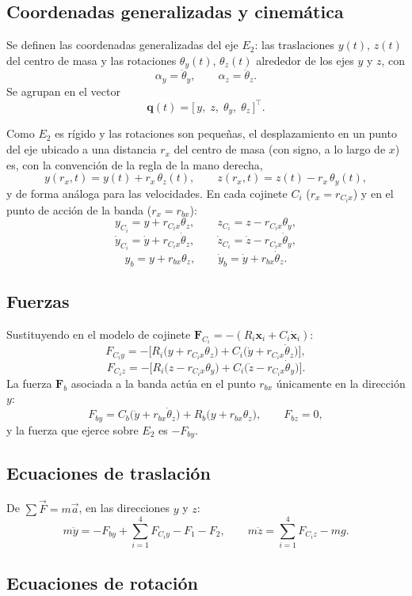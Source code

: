 \subsection{Coordenadas generalizadas y cinemática}

Se definen las coordenadas generalizadas del eje $E_2$: las traslaciones $y(t)$, $z(t)$ del centro de masa y las rotaciones 
$\theta_y(t)$, $\theta_z(t)$ alrededor de los ejes $y$ y $z$, con
\[
\alpha_y=\ddot\theta_y,\qquad \alpha_z=\ddot\theta_z .
\]
Se agrupan en el vector
\[
\mathbf q(t)=\big[\,y,\;z,\;\theta_y,\;\theta_z\,\big]^\top .
\]

Como $E_2$ es rígido y las rotaciones son pequeñas, el desplazamiento en un punto del eje ubicado a una distancia $r_x$ 
del centro de masa (con signo, a lo largo de $x$) es, con la convención de la regla de la mano derecha,
\[
y(r_x,t)=y(t)+r_x\,\theta_z(t),\qquad
z(r_x,t)=z(t)-r_x\,\theta_y(t),
\]
y de forma análoga para las velocidades. En cada cojinete $C_i$ ($r_x=r_{C_ix}$) y en el punto de acción de la banda 
($r_x=r_{bx}$):
\[
y_{C_i}=y+r_{C_ix}\theta_z,\qquad z_{C_i}=z-r_{C_ix}\theta_y,
\]
\[
\dot y_{C_i}=\dot y+r_{C_ix}\dot\theta_z,\qquad \dot z_{C_i}=\dot z-r_{C_ix}\dot\theta_y,
\]
\[
y_b=y+r_{bx}\theta_z,\qquad \dot y_b=\dot y+r_{bx}\dot\theta_z .
\]

\subsection{Fuerzas}

Sustituyendo en el modelo de cojinete $\mathbf F_{C_i}=-(R_i\mathbf x_i+C_i\dot{\mathbf x}_i)$:
\[
F_{C_iy}=-\big[R_i\big(y+r_{C_ix}\theta_z\big)+C_i\big(\dot y+r_{C_ix}\dot\theta_z\big)\big],
\]
\[
F_{C_iz}=-\big[R_i\big(z-r_{C_ix}\theta_y\big)+C_i\big(\dot z-r_{C_ix}\dot\theta_y\big)\big].
\]
La fuerza $\mathbf F_b$ asociada a la banda actúa en el punto $r_{bx}$ únicamente en la dirección $y$:
\[
F_{by}=C_b\big(\dot y+r_{bx}\dot\theta_z\big)+R_b\big(y+r_{bx}\theta_z\big),
\qquad F_{bz}=0 ,
\]
y la fuerza que ejerce sobre $E_2$ es $-F_{by}$.

\subsection{Ecuaciones de traslación}

De $\sum\vec F=m\vec a$, en las direcciones $y$ y $z$:
\[
m\ddot y=-F_{by}+\sum_{i=1}^4F_{C_iy}-F_1-F_2,
\qquad
m\ddot z=\sum_{i=1}^4F_{C_iz}-mg .
\]

\subsection{Ecuaciones de rotación}


